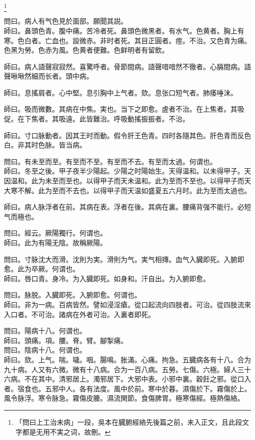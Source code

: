 	\footnote{「問曰上工治未病」一段，吳本在臓腑經絡先後篇之前，未入正文，且此段文字都是无用不実之词，故刪。}

問曰。病人有气色見於面部。願聞其説。\\
師曰。鼻頭色青。腹中痛。苦冷者死。鼻頭色微黑者。有水气。色黄者。胸上有寒。色白者。亡血也。設微赤。非时者死。其目正圓者。痙。不治。又色青为痛。色黑为勞。色赤为風。色黄者便難。色鲜明者有留飲。

師曰。病人語聲寂寂然。喜驚呼者。骨節間病。語聲喑喑然不徹者。心膈間病。語聲啾啾然細而长者。頭中病。

師曰。息搖肩者。心中堅。息引胸中上气者。欬。息张口短气者。肺痿唾沫。

師曰。吸而微數。其病在中焦。実也。当下之即愈。虗者不治。在上焦者。其吸促。在下焦者。其吸遠。此皆難治。呼吸動搖振振者。不治。

師曰。寸口脉動者。因其王时而動。假令肝王色青。四时各隨其色。肝色青而反色白。非其时色脉。皆当病。

問曰。有未至而至。有至而不至。有至而不去。有至而太過。何谓也。\\
師曰。冬至之後。甲子夜半少陽起。少陽之时陽始生。天得温和。以未得甲子。天因温和。此为未至而至也。以得甲子而天未温和。此为至而不至也。以得甲子而天大寒不解。此为至而不去也。以得甲子而天温如盛夏五六月时。此为至而太過也。

師曰。病人脉浮者在前。其病在表。浮者在後。其病在裏。腰痛背强不能行。必短气而極也。

問曰。經云。厥陽獨行。何谓也。\\
師曰。此为有陽无陰。故稱厥陽。

問曰。寸脉沈大而滑。沈則为実。滑則为气。実气相摶。血气入臓即死。入腑即愈。此为卒厥。何谓也。\\
師曰。唇口青。身冷。为入臓即死。如身和。汗自出。为入腑即愈。

問曰。脉脱。入臓即死。入腑即愈。何谓也。\\
師曰。非为一病。百病皆然。譬如浸淫瘡。從口起流向四肢者。可治。從四肢流來入口者。不可治。{\khaaitp 諸}病在外者可治。入裏者即死。

問曰。陽病十八。何谓也。\\
師曰。頭痛。項。腰。脊。臂。腳掣痛。\\
問曰。陰病十八。何谓也。\\
師曰。欬。上气。喘。噦。咽。腸鳴。胀滿。心痛。拘急。五臓病各有十八。合为九十病。人又有六微。微有十八病。合为一百八病。五勞。七傷。六極。婦人三十六病。不在其中。清邪居上。濁邪居下。大邪中表。小邪中裏。穀飪之邪。從口入者。宿食也。五邪中人。各有法度。風中於前。寒中於暮。濕傷於下。霧傷於上。風令脉浮。寒令脉急。霧傷皮腠。濕流関節。食傷脾胃。極寒傷經。極熱傷絡。

